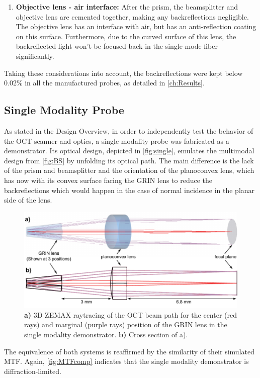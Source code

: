 \begin{enumerate}
\item \textbf{Objective lens - air interface:} After the prism, the beamsplitter and objective lens are cemented together, making any backreflections negligible. The objective lens has an interface with air, but has an anti-reflection coating on this surface. Furthermore, due to the curved surface of this lens, the backreflected light won't be focused back in the single mode fiber significantly.
\end{enumerate}

Taking these considerations into account, the backreflections were kept below 0.02\% in all the manufactured probes, as detailed in \autoref{ch:Results}.

\subsection{Single Modality Probe}
As stated in the Design Overview, in order to independently test the behavior of the OCT scanner and optics, a single modality probe was fabricated as a demonstrator. Its optical design, depicted in \autoref{fig:single}, emulates the multimodal design from \autoref{fig:BS} by unfolding its optical path. The main difference is the lack of the prism and beamsplitter and the orientation of the planoconvex lens, which has now with its convex surface facing the GRIN lens to reduce the backreflections which would happen in the case of normal incidence in the planar side of the lens.

\begin{figure}[h!]\centering
      \includegraphics[width=12cm]{figures/30_DesignSimulation/Optical/singleAll.pdf}
      \caption{\textbf{a)} 3D ZEMAX raytracing of the OCT beam path for the center (red rays) and marginal (purple rays) position of the GRIN lens in the single modality demonstrator.
      \textbf{b)} Cross section of a).}
      \label{fig:single}
\end{figure}

The equivalence of both systems is reaffirmed by the similarity of their simulated MTF. Again, \autoref{fig:MTFcomp} indicates that the single modality demonstrator is diffraction-limited.

